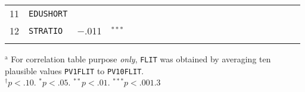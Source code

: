{\begin{tabular}{cl r@{\hskip -0.1mm}l r@{\hskip -0.1mm}l r@{\hskip -0.1mm}l r@{\hskip -0.1mm}l r@{\hskip -0.1mm}l r@{\hskip -0.1mm}l r@{\hskip -0.1mm}l r@{\hskip -0.1mm}l r@{\hskip -0.1mm}l r@{\hskip -0.1mm}l}
      \cmidrule{1-6}    11    & \texttt{EDUSHORT} &       &       &       &       &       &       &       &       &       &       &       &       &       &       &       &       &       &       &  \\
            12    & \texttt{STRATIO} & \cellcolor[rgb]{ 1,  .988,  .988}$-$.011 & $^{***}$   &       &       &       &       &       &       &       &       &       &       &       &       &       &       &       &       &       &  \\
      \cmidrule[0.08em]{1-6}
      &       &       &       &       &       &       &       &       &       &       &       &       &       &       &       &       &       &       &       &       &  \\
      \end{tabular}
}{$^\text{a}$ For correlation table purpose \emph{only}, \texttt{FLIT} was obtained by averaging ten plausible values \texttt{PV1FLIT} to \texttt{PV10FLIT}.\\
$^\dagger p < .10$. $^* p < .05$. $^{**} p < .01$. $^{***} p < .001$.}{3}
